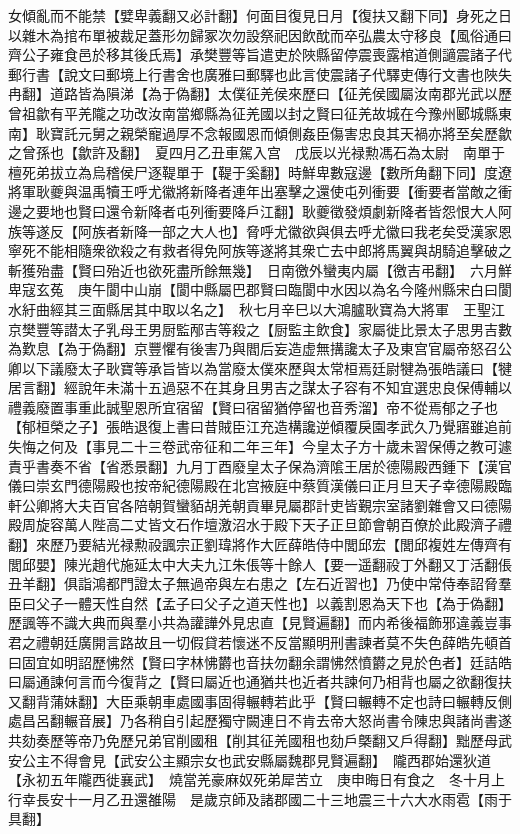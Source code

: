 女傾亂而不能禁【嬖卑義翻又必計翻】何面目復見日月【復扶又翻下同】身死之日以雜木為捾布單被裁足蓋形勿歸冢次勿設祭祀因飲酖而卒弘農太守移良【風俗通曰齊公子雍食邑於移其後氏焉】承樊豐等旨遣吏於陜縣留停震喪露棺道側讁震諸子代郵行書【說文曰郵境上行書舍也廣雅曰郵驛也此言使震諸子代驛吏傳行文書也陜失冉翻】道路皆為隕涕【為于偽翻】太僕征羌侯來歷曰【征羌侯國屬汝南郡光武以歷曾祖歙有平羌隴之功改汝南當鄉縣為征羌國以封之賢曰征羌故城在今豫州郾城縣東南】耿寶託元舅之親榮寵過厚不念報國恩而傾側姦臣傷害忠良其天禍亦將至矣歷歙之曾孫也【歙許及翻】　夏四月乙丑車駕入宫　戊辰以光禄勲馮石為太尉　南單于檀死弟拔立為烏稽侯尸逐鞮單于【鞮于奚翻】時鮮卑數寇邊【數所角翻下同】度遼將軍耿夔與温禹犢王呼尤徽將新降者連年出塞擊之還使屯列衝要【衝要者當敵之衝邊之要地也賢曰還令新降者屯列衝要降戶江翻】耿夔徵發煩劇新降者皆怨恨大人阿族等遂反【阿族者新降一部之大人也】脅呼尤徽欲與俱去呼尤徽曰我老矣受漢家恩寧死不能相隨衆欲殺之有救者得免阿族等遂將其衆亡去中郎將馬翼與胡騎追擊破之斬獲殆盡【賢曰殆近也欲死盡所餘無幾】　日南徼外蠻夷内屬【徼吉弔翻】　六月鮮卑寇玄菟　庚午閬中山崩【閬中縣屬巴郡賢曰臨閬中水因以為名今隆州縣宋白曰閬水紆曲經其三面縣居其中取以名之】　秋七月辛巳以大鴻臚耿寶為大將軍　王聖江京樊豐等譛太子乳母王男厨監邴吉等殺之【厨監主飲食】家屬徙比景太子思男吉數為歎息【為于偽翻】京豐懼有後害乃與閻后妄造虚無搆讒太子及東宫官屬帝怒召公卿以下議廢太子耿寶等承旨皆以為當廢太僕來歷與太常桓焉廷尉犍為張皓議曰【犍居言翻】經說年未滿十五過惡不在其身且男吉之謀太子容有不知宜選忠良保傅輔以禮義廢置事重此誠聖恩所宜宿留【賢曰宿留猶停留也音秀溜】帝不從焉郁之子也【郁桓榮之子】張皓退復上書曰昔賊臣江充造構讒逆傾覆戾園孝武久乃覺寤雖追前失悔之何及【事見二十三卷武帝征和二年三年】今皇太子方十歲未習保傅之教可遽責乎書奏不省【省悉景翻】九月丁酉廢皇太子保為濟隂王居於德陽殿西鍾下【漢官儀曰崇玄門德陽殿也按帝紀德陽殿在北宫掖庭中蔡質漢儀曰正月旦天子幸德陽殿臨軒公卿將大夫百官各陪朝賀蠻貊胡羌朝貢畢見屬郡計吏皆覲宗室諸劉雜會又曰德陽殿周旋容萬人陛高二丈皆文石作壇激沼水于殿下天子正旦節會朝百僚於此殿濟子禮翻】來歷乃要結光禄勲祋諷宗正劉瑋將作大匠薛皓侍中閭邱宏【閭邱複姓左傳齊有閭邱嬰】陳光趙代施延太中大夫九江朱倀等十餘人【要一遥翻祋丁外翻又丁活翻倀丑羊翻】俱詣鴻都門證太子無過帝與左右患之【左石近習也】乃使中常侍奉詔脅羣臣曰父子一體天性自然【孟子曰父子之道天性也】以義割恩為天下也【為于偽翻】歷諷等不識大典而與羣小共為讙譁外見忠直【見賢遍翻】而内希後福飾邪違義豈事君之禮朝廷廣開言路故且一切假貸若懷迷不反當顯明刑書諫者莫不失色薛皓先頓首曰固宜如明詔歷怫然【賢曰字林怫欝也音扶勿翻余謂怫然憤欝之見於色者】廷詰皓曰屬通諫何言而今復背之【賢曰屬近也通猶共也近者共諫何乃相背也屬之欲翻復扶又翻背蒲妹翻】大臣乘朝車處國事固得輾轉若此乎【賢曰輾轉不定也詩曰輾轉反側處昌呂翻輾音展】乃各稍自引起歷獨守闕連日不肯去帝大怒尚書令陳忠與諸尚書遂共劾奏歷等帝乃免歷兄弟官削國租【削其征羌國租也劾戶槩翻又戶得翻】黜歷母武安公主不得會見【武安公主顯宗女也武安縣屬魏郡見賢遍翻】　隴西郡始還狄道【永初五年隴西徙襄武】　燒當羌豪麻奴死弟犀苦立　庚申晦日有食之　冬十月上行幸長安十一月乙丑還雒陽　是歲京師及諸郡國二十三地震三十六大水雨雹【雨于具翻】

